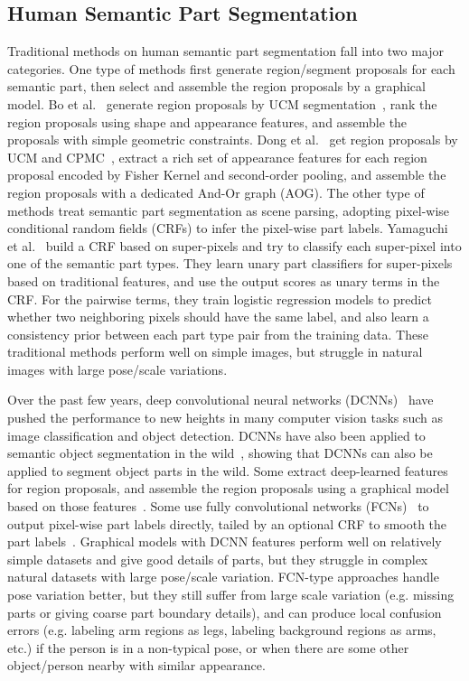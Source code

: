 \subsection{Human Semantic Part Segmentation}
Traditional methods on human semantic part segmentation fall into two major categories.
One type of methods first generate region/segment proposals for each semantic part, then select and assemble the region proposals by a graphical model.
Bo et al.~\cite{bo2011shape} generate region proposals by UCM segmentation~\cite{arbelaez2009contours}, rank the region proposals using shape and appearance features, and assemble the proposals with simple geometric constraints.
Dong et al.~\cite{dong2013deformable} get region proposals by UCM and CPMC~\cite{carreira2012cpmc}, extract a rich set of appearance features for each region proposal encoded by Fisher Kernel and second-order pooling, and assemble the region proposals with a dedicated And-Or graph (AOG).
The other type of methods treat semantic part segmentation as scene parsing, adopting pixel-wise conditional random fields (CRFs) to infer the pixel-wise part labels.
Yamaguchi et al.~\cite{yamaguchi2012parsing} build a CRF based on super-pixels and try to classify each super-pixel into one of the semantic part types.
They learn unary part classifiers for super-pixels based on traditional features, and use the output scores as unary terms in the CRF.
For the pairwise terms, they train logistic regression models to predict whether two neighboring pixels should have the same label, and also learn a consistency prior between each part type pair from the training data.
These traditional methods perform well on simple images, but struggle in natural images with large pose/scale variations.

Over the past few years, deep convolutional neural networks (DCNNs)~\cite{lecun1998gradient} have pushed the performance to new heights in many computer vision tasks such as image classification and object detection. DCNNs have also been applied to semantic object segmentation in the wild~\cite{chen2016deeplab,dai2015boxsup,papandreou2015weakly}, showing that DCNNs can also be applied to segment object parts in the wild.
Some extract deep-learned features for region proposals, and assemble the region proposals using a graphical model based on those features~\cite{xia2016pose}.
Some use fully convolutional networks (FCNs)~\cite{long2015fully} to output pixel-wise part labels directly, tailed by an optional CRF to smooth the part labels~\cite{long2015fully,chen2016deeplab,wang2015joint}. Graphical models with DCNN features perform well on relatively simple datasets and give good details of parts, but they struggle in complex natural datasets with large pose/scale variation. FCN-type approaches handle pose variation better, but they still suffer from large scale variation (e.g. missing parts or giving coarse part boundary details), and can produce local confusion errors (e.g. labeling arm regions as legs, labeling background regions as arms, etc.) if the person is in a non-typical pose, or when there are some other object/person nearby with similar appearance.


